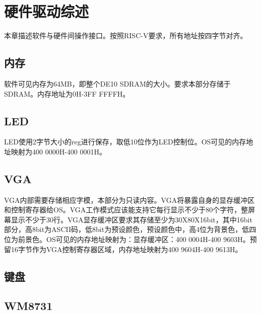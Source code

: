 %
% 
% 
% 
% 
% 
% 
%

\chapter{硬件驱动综述}
本章描述软件与硬件间操作接口。按照RISC-V要求，所有地址按四字节对齐。
\section{内存}
软件可见内存为64MB，即整个DE10 SDRAM的大小。要求本部分存储于SDRAM。内存地址为0H-3FF FFFFH。
\section{LED}
LED使用2字节大小的reg进行保存，取低10位作为LED控制位。OS可见的内存地址映射为400 0000H-400 0001H。
\section{VGA}
VGA内部需要存储相应字模，本部分为只读内容。VGA将暴露自身的显存缓冲区和控制寄存器给OS。VGA工作模式应该能支持它每行显示不少于80个字符，整屏幕显示不少于30行。VGA显存缓冲区要求其存储至少为30X80X16bit，其中16bit部分，高8bit为ASCII码，低8bit为预设颜色，预设颜色中，高4位为背景色，低四位为前景色。OS可见的内存地址映射为：显存缓冲区：400 0004H-400 9603H。预留16字节作为VGA控制寄存器区域，内存地址映射为400 9604H-400 9613H。
\section{键盘}
\section{WM8731}